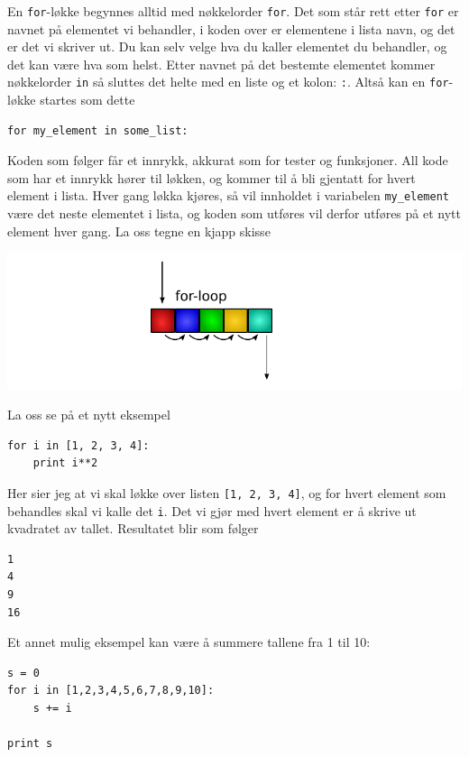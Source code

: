 \documentclass[a4paper, 11pt, notitlepage]{article}
\begin{document}
En \verb+for+-løkke begynnes alltid med nøkkelorder \verb+for+. Det som står rett etter \verb+for+ er navnet på elementet vi behandler, i koden over er elementene i lista navn, og det er det vi skriver ut. Du kan selv velge hva du kaller elementet du behandler, og det kan være hva som helst. Etter navnet på det bestemte elementet kommer nøkkelorder \verb+in+ så sluttes det helte med en liste og et kolon: \verb+:+. Altså kan en \verb+for+-løkke startes som dette
\begin{lstlisting}
for my_element in some_list:
\end{lstlisting}
Koden som følger får et innrykk, akkurat som for tester og funksjoner. All kode som har et innrykk hører til løkken, og kommer til å bli gjentatt for hvert element i lista. Hver gang løkka kjøres, så vil innholdet i variabelen \verb+my_element+ være det neste elementet i lista, og koden som utføres vil derfor utføres på et nytt element hver gang. La oss tegne en kjapp skisse

\begin{centering}
	\includegraphics[width=\textwidth]{for_loop}
\end{centering}

La oss se på et nytt eksempel
\begin{lstlisting}
for i in [1, 2, 3, 4]:
	print i**2
\end{lstlisting}
Her sier jeg at vi skal løkke over listen \verb+[1, 2, 3, 4]+, og for hvert element som behandles skal vi kalle det \verb+i+. Det vi gjør med hvert element er å skrive ut kvadratet av tallet. Resultatet blir som følger
\begin{verbatim}
1
4
9
16
\end{verbatim}

Et annet mulig eksempel kan være å summere tallene fra 1 til 10:
\begin{lstlisting}
s = 0
for i in [1,2,3,4,5,6,7,8,9,10]:
	s += i

print s
\end{lstlisting}
\end{document}
